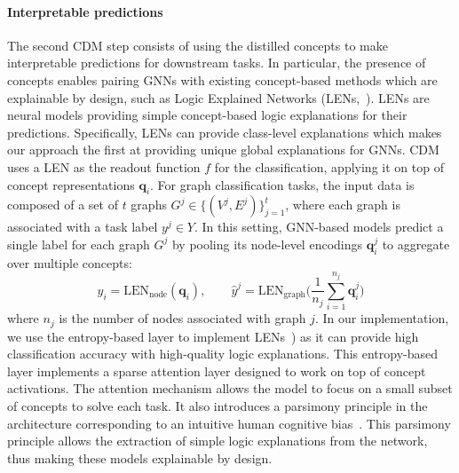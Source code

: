 \paragraph{Interpretable predictions}
The second CDM step consists of using the distilled concepts to make interpretable predictions for downstream tasks. In particular, the presence of concepts enables pairing GNNs with existing concept-based methods which are explainable by design, such as Logic Explained Networks (LENs,~\citep{ciravegna2021logic}). LENs are neural models providing simple concept-based logic explanations for their predictions. Specifically, LENs can provide class-level explanations which makes our approach the first at providing unique global explanations for GNNs. CDM uses a LEN as the readout function $f$ for the classification, applying it on top of concept representations $\mathbf{q}_i$. For graph classification tasks, the input data is composed of a set of $t$ graphs $G^j \in \{(V^j, E^j)\}_{j=1}^t$, where each graph is associated with a task label $y^j \in Y$. In this setting, GNN-based models predict a single label for each graph $G^j$ by pooling its node-level encodings $\mathbf{q}_i^j$ to aggregate over multiple concepts:
\begin{equation} \label{eq:lens}
    \hat{y}_i = \text{LEN}_{\text{node}} ( \mathbf{q}_i), \qquad
    \hat{y}^j = \text{LEN}_{\text{graph}} \Bigg(\frac{1}{n_j} \sum_{i=1}^{n_j} \mathbf{q}_i^j \Bigg)
\end{equation}
where $n_j$ is the number of nodes associated with graph $j$. In our implementation, we use the entropy-based layer to implement LENs~\citep{barbiero2021entropy}) as it can provide high classification accuracy with high-quality logic explanations. This entropy-based layer implements a sparse attention layer designed to work on top of concept activations.
The attention mechanism allows the model to focus on a small subset of concepts to solve each task. It also introduces a parsimony principle in the architecture corresponding to an intuitive human cognitive bias~\citep{miller1956magical}. This parsimony principle allows the extraction of simple logic explanations from the network, thus making these models explainable by design. 

